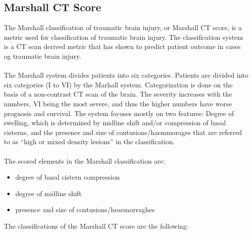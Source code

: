 \documentclass[11pt]{article}
\begin{document}
\subsection{Marshall CT Score}
The Marshall classification of traumatic brain injury, or Marshall CT score, is a metric used for classification of traumatic brain injury. The classification system is a CT scan derived metric that has shown to predict patient outcome in cases og traumatic brain injury.\cite{gaillardMarshallClassificationTraumatic}\\
\\
The Marshall system divides patients into six categories.
Patients are divided into six categories (I to VI) by the Marhall system. Categorization is done on the basis of a non-contrast CT scan of the brain. The severity increases with the numbers, VI being the most severe, and thus the higher numbers have worse prognosis and survival. The system focuses mostly on two features: Degree of swelling, which is determined by midline shift and/or compression of basal cisterns, and the presence and size of contusions/haemmorages that are referred to as ``high or mixed density lesions'' in the classification.\cite{gaillardMarshallClassificationTraumatic}\\
\\
The scored elements in the Marshall classification are:

\begin{itemize}
\item{degree of basal cistern compression}
\item{degree of midline shift}
\item{presence and size of contusions/heaemorraghes}
\end{itemize}

The classifications of the Marshall CT score are the following:
\end{document}
